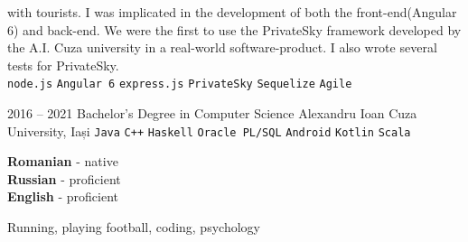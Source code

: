 \documentclass[9pt]{developercv} %
\begin{document}
\begin{entrylist}
{		with tourists. I was implicated in the development of both the front-end(Angular 6) and back-end.
		 We were the first to use the PrivateSky framework developed by the A.I. Cuza university in
		 a real-world software-product. I also wrote several tests for PrivateSky.
		\\  \texttt{node.js}\slashsep
			\texttt{Angular 6}\slashsep
			\texttt{express.js}\slashsep
		    \texttt{PrivateSky}\slashsep
		    \texttt{Sequelize}\slashsep
		    \texttt{Agile}
		}
\end{entrylist}



\begin{entrylist}
	\entry
		{2016 -- 2021}
		{Bachelor's Degree in Computer Science}
		{Alexandru Ioan Cuza University, Iași}
		{\texttt{Java}\slashsep
		 \texttt{C++}\slashsep
		 \texttt{Haskell}\slashsep
		 \texttt{Oracle PL/SQL}\slashsep
		 \texttt{Android}\slashsep
		 \texttt{Kotlin}\slashsep
		 \texttt{Scala}
		}
\end{entrylist}


\begin{minipage}[t]{0.3\textwidth}
	\vspace{-\baselineskip} %

	
	\textbf{Romanian} - native\\
	\textbf{Russian} - proficient\\
	\textbf{English} - proficient
\end{minipage}
\hfill
\begin{minipage}[t]{0.3\textwidth}
	\vspace{-\baselineskip} %
	
	
	Running, playing football, coding, psychology
\end{minipage}

\end{document}
